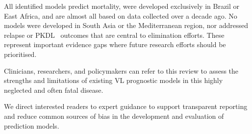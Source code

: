 All identified models predict mortality, were developed exclusively in Brazil or East Africa, and are almost all based on data collected over a decade ago. No models were developed in South Asia or the Mediterranean region, nor addressed relapse or PKDL \textemdash\ outcomes that are central to elimination efforts. These represent important evidence gaps where future research efforts should be prioritised.

Clinicians, researchers, and policymakers can refer to this review to assess the strengths and limitations of existing VL prognostic models in this highly neglected and often fatal disease.

We direct interested readers to expert guidance to support transparent reporting and reduce common sources of bias in the development and evaluation of prediction models.